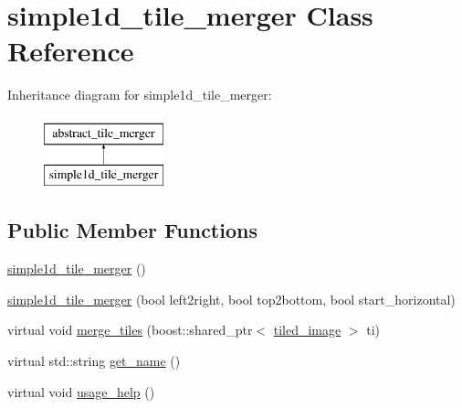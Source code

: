 \hypertarget{classsimple1d__tile__merger}{\section{simple1d\-\_\-tile\-\_\-merger Class Reference}
\label{classsimple1d__tile__merger}
}
Inheritance diagram for simple1d\-\_\-tile\-\_\-merger\-:\begin{figure}[H]
\begin{center}
\leavevmode
\includegraphics[height=2.000000cm]{classsimple1d__tile__merger}
\end{center}
\end{figure}
\subsection*{Public Member Functions}
\begin{DoxyCompactItemize}
\item 
\hyperlink{classsimple1d__tile__merger_a81b44df8dc122d9f7a5ab84f34aa5bed}{simple1d\-\_\-tile\-\_\-merger} ()
\item 
\hyperlink{classsimple1d__tile__merger_aaa0bc848ba9949cdf7d3b7a3021f00a9}{simple1d\-\_\-tile\-\_\-merger} (bool left2right, bool top2bottom, bool start\-\_\-horizontal)
\item 
virtual void \hyperlink{classsimple1d__tile__merger_ad73f710dd3ea0116859dcf2e5f6c5a14}{merge\-\_\-tiles} (boost\-::shared\-\_\-ptr$<$ \hyperlink{classtiled__image}{tiled\-\_\-image} $>$ ti)
\item 
virtual std\-::string \hyperlink{classsimple1d__tile__merger_ac0810b20cdeb08613cb2a214267cf26a}{get\-\_\-name} ()
\item 
virtual void \hyperlink{classsimple1d__tile__merger_a4f18628ddf20f24efc13e705b469268c}{usage\-\_\-help} ()
\end{DoxyCompactItemize}


